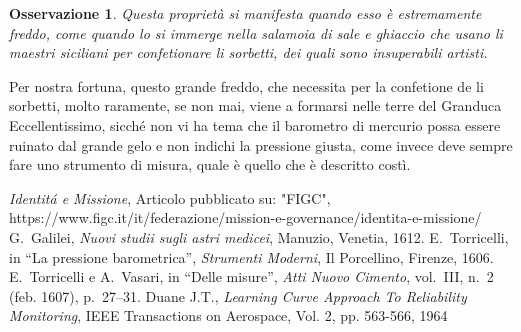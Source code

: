 \documentclass[
    corpo=11.5pt,
    oneside,
    evenboxes,
    tipotesi=triennale,
    stile=classica,
    oldstyle,
    autoretitolo,
    greek,
]{toptesi}
\newtheorem{osservazione}{Osservazione}
\begin{document}
\begin{interlinea}{1.5}

\begin{osservazione}\normalfont
Questa propriet\`a si manifesta quando esso \`e estremamente freddo, come
quando lo si immerge nella salamoia di sale e ghiaccio che usano li maestri
siciliani per confetionare li sorbetti, dei quali sono insuperabili artisti.
\end{osservazione}

Per nostra fortuna, questo grande freddo, che necessita per la confetione de
li sorbetti, molto raramente, se non mai, viene a formarsi nelle terre del
Granduca Eccellentissimo, sicch\'e non vi ha tema che il barometro di mercurio
possa essere ruinato dal grande gelo e non indichi la pressione giusta, come
invece deve sempre fare uno strumento di misura, quale \`e quello che \`e
descritto cost\`i.\cite{duane1964}

\end{interlinea}

\appendix

\begin{thebibliography}{9}
 {\em Identit\'a e Missione}, Articolo pubblicato su: "FIGC",
                https://www.figc.it/it/federazione/mission-e-governance/identita-e-missione/
 G.~Galilei, {\em Nuovi studii sugli astri medicei}, Manuzio,
        Venetia, 1612.
 E.~Torricelli, in ``La pressione barometrica'', {\em Strumenti
        Moderni}, Il Porcellino, Firenze, 1606.
 E.~Torricelli e A.~Vasari, in ``Delle misure'', {\em Atti Nuovo
        Cimento}, vol.~III, n.~2 (feb. 1607), p.~27--31.
 Duane J.T., \emph{Learning Curve Approach To Reliability 
		Monitoring}, IEEE Transactions on Aerospace, Vol. 2, pp. 563-566, 1964
\end{thebibliography}
\end{document}

